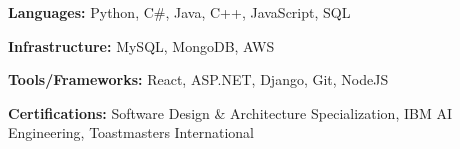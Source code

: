\begin{siderulesSos}
\begin{skillSection}
\cvskillentry
    {
      \begin{cvsositems}
        \item {\color{black}\textbf{Languages:} Python, C\#, Java, C++, JavaScript, SQL}
        \item {\color{black}\textbf{Infrastructure:} MySQL, MongoDB, AWS }
        \item {\color{black}\textbf{Tools/Frameworks:} React, ASP.NET, Django, Git, NodeJS}
        \item {\color{black}\textbf{Certifications:} Software Design \& Architecture Specialization, IBM AI Engineering, Toastmasters International}
      \end{cvsositems}
    }
\end{skillSection}
\end{siderulesSos}